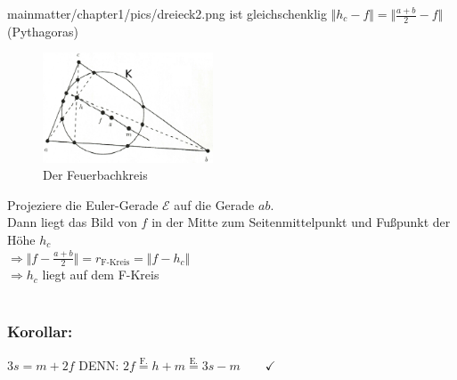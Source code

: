 \begin{enumerate}
	{mainmatter/chapter1/pics/dreieck2.png} ist gleichschenklig $\Vert h_{c}-f \Vert = \Vert 
	\frac{a+b}{2} -f \Vert$ (Pythagoras)
	\begin{figure} [H]
	\centering
	\includegraphics[width=0.45\textwidth]
	{mainmatter/chapter1/pics/feuerbachkreis.png}
	\caption{Der Feuerbachkreis}
	\end{figure}
\end{enumerate}
Projeziere die Euler-Gerade $\mathcal{E}$ auf die Gerade $ab$. \\
Dann liegt das Bild von $f$ in der Mitte zum Seitenmittelpunkt und Fußpunkt der Höhe $h_{c}$\\
$\Rightarrow \Vert f-\frac{a+b}{2}\Vert = r_{\text{F-Kreis}}=\Vert f-h_{c} \Vert$\\
$\Rightarrow h_{c}$ liegt auf dem F-Kreis\\
\qquad\\
\subsubsection{Korollar:}
$3s=m+2f$ DENN: $2f \mathop{=}\limits^{\text{F.}}h+m \mathop{=}\limits^{\text{E.}}3s-m \qquad \checkmark$